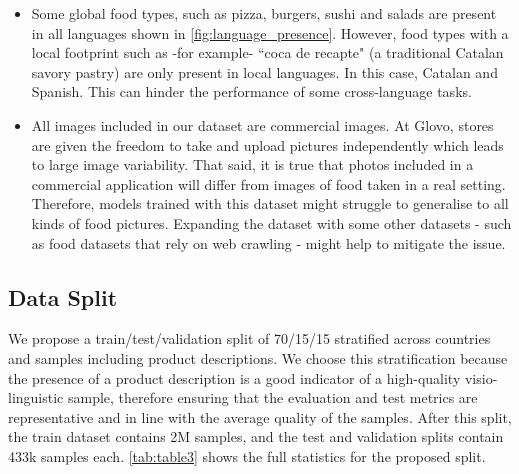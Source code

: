 \documentclass[10pt,twocolumn,letterpaper]{article}
\begin{document}
\begin{itemize}
    \item Some global food types, such as pizza, burgers, sushi and salads are present in all languages shown in \cref{fig:language_presence}. However, food types with a local footprint such as -for example- ``coca de recapte" (a traditional Catalan savory pastry) are only present in local languages. In this case, Catalan and Spanish. This can hinder the performance of some cross-language tasks.
    \item All images included in our dataset are commercial images. At Glovo, stores are given the freedom to take and upload pictures independently which leads to large image variability. That said, it is true that photos included in a commercial application will differ from images of food taken in a real setting. Therefore, models trained with this dataset might struggle to generalise to all kinds of food pictures. Expanding the dataset with some other datasets - such as food datasets that rely on web crawling - might help to mitigate the issue.
\end{itemize}




\subsection{Data Split}\label{sec:proposed_split}
We propose a train/test/validation split of 70/15/15 stratified across countries and samples including product descriptions. We choose this stratification because the presence of a product description is a good indicator of a high-quality visio-linguistic sample, therefore ensuring that the evaluation and test metrics are representative and in line with the average quality of the samples. After this split, the train dataset contains 2M samples, and the test and validation splits contain 433k samples each. \cref{tab:table3} shows the full statistics for the proposed split. 
\end{document}
